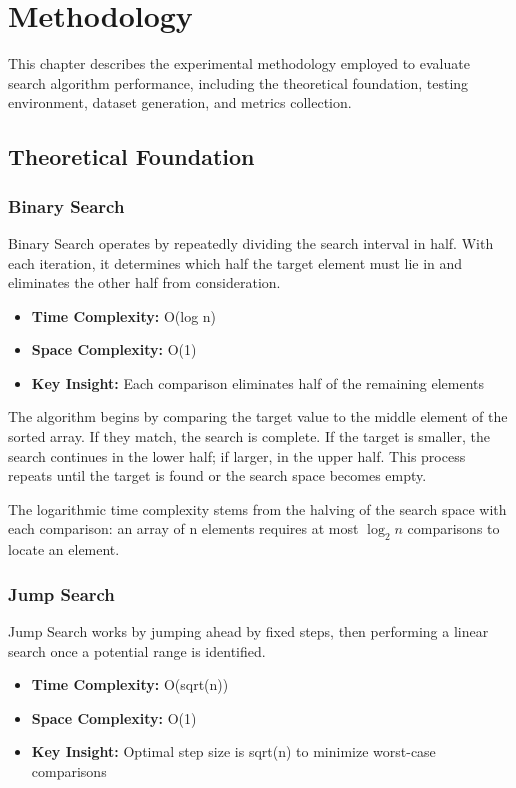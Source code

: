 \chapter{Methodology}

This chapter describes the experimental methodology employed to evaluate search algorithm performance, including the theoretical foundation, testing environment, dataset generation, and metrics collection.

\section{Theoretical Foundation}

\subsection{Binary Search}
Binary Search operates by repeatedly dividing the search interval in half. With each iteration, it determines which half the target element must lie in and eliminates the other half from consideration.

\begin{itemize}
    \item \textbf{Time Complexity:} O(log n)
    \item \textbf{Space Complexity:} O(1)
    \item \textbf{Key Insight:} Each comparison eliminates half of the remaining elements
\end{itemize}

The algorithm begins by comparing the target value to the middle element of the sorted array. If they match, the search is complete. If the target is smaller, the search continues in the lower half; if larger, in the upper half. This process repeats until the target is found or the search space becomes empty.

The logarithmic time complexity stems from the halving of the search space with each comparison: an array of n elements requires at most $\log_2 n$ comparisons to locate an element.

\subsection{Jump Search}
Jump Search works by jumping ahead by fixed steps, then performing a linear search once a potential range is identified.

\begin{itemize}
    \item \textbf{Time Complexity:} O(sqrt(n))
    \item \textbf{Space Complexity:} O(1)
    \item \textbf{Key Insight:} Optimal step size is sqrt(n) to minimize worst-case comparisons
\end{itemize}

